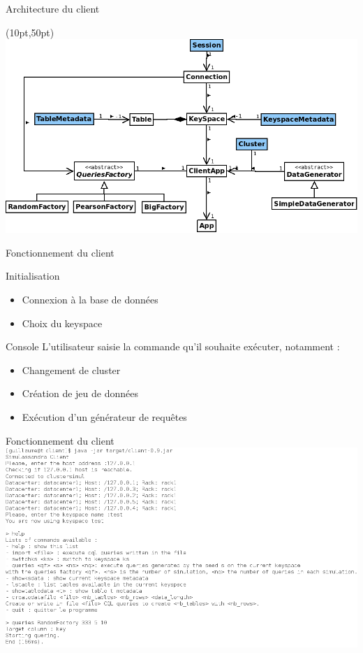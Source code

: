\documentclass{beamer}
\begin{document}
\begin{frame}{Architecture du client}
\begin{textblock*}{\paperwidth}(10pt,50pt)
    \includegraphics[scale=0.4]{architecture_client}
\end{textblock*}
\end{frame}


\begin{frame}{Fonctionnement du client}
  \begin{block}{Initialisation}
    \begin{itemize}
    \item Connexion à la base de données
    \item Choix du keyspace
    \end{itemize}
  \end{block}

  \begin{block}{Console}
  L'utilisateur saisie la commande qu'il souhaite exécuter, notamment :
    \begin{itemize}
    \item Changement de cluster
    \item Création de jeu de données
    \item Exécution d'un générateur de requêtes
    \end{itemize}
  \end{block}
\end{frame}

\begin{frame}{Fonctionnement du client}
\centering
    \includegraphics[scale=0.40]{captureclient}
\end{frame}
\end{document}
